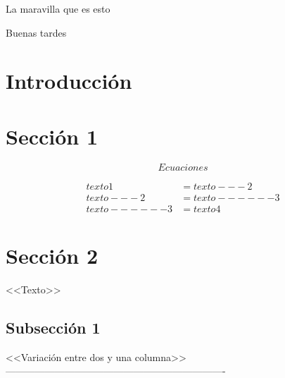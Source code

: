 \documentclass[letterpaper,11pt]{article}
\begin{document}


%

\begin{resumen}
    La maravilla que es esto
\end{resumen}

\begin{abs}
    Buenas tardes
\end{abs}

\begin{multicols}{2}

\section{Introducción}

\section{Sección 1} 

\begin{equation}
    Ecuaciones
\label{ecuacion}
\end{equation}

\begin{equation*} %
\begin{split}
    texto1 & = texto---2 \\
    texto---2 & = texto------3 \\
    texto------3 & = texto4
\end{split}
\end{equation*}

\section{Sección 2}

<<Texto>>

\end{multicols}

\subsection{Subsección 1}

<<Variación entre dos y una columna>> -------------------------------------------------------------------
\end{document}
